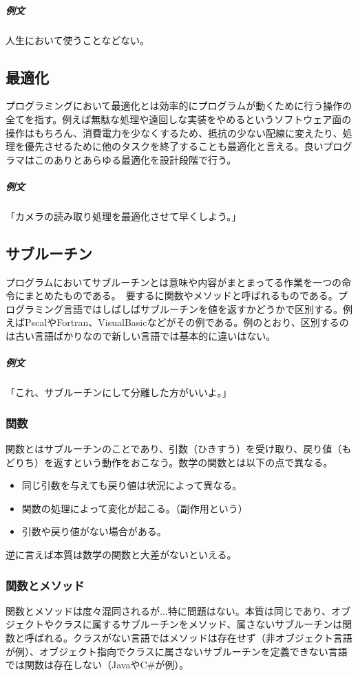 \documentclass[dvipdfmx,jb5]{jreport}
\begin{document}
\subparagraph{例文} 人生において使うことなどない。

\subsection{最適化}
プログラミングにおいて最適化とは効率的にプログラムが動くために行う操作の全てを指す。例えば無駄な処理や遠回しな実装をやめるというソフトウェア面の操作はもちろん、消費電力を少なくするため、抵抗の少ない配線に変えたり、処理を優先させるために他のタスクを終了することも最適化と言える。良いプログラマはこのありとあらゆる最適化を設計段階で行う。

\subparagraph{例文} 「カメラの読み取り処理を最適化させて早くしよう。」

\subsection{サブルーチン}
プログラムにおいてサブルーチンとは意味や内容がまとまってる作業を一つの命令にまとめたものである。　要するに関数やメソッドと呼ばれるものである。プログラミング言語ではしばしばサブルーチンを値を返すかどうかで区別する。例えばPscalやFortran、VisualBasicなどがその例である。例のとおり、区別するのは古い言語ばかりなので新しい言語では基本的に違いはない。

\subparagraph{例文} 「これ、サブルーチンにして分離した方がいいよ。」

\subsubsection{関数}
関数とはサブルーチンのことであり、引数（ひきすう）を受け取り、戻り値（もどりち）を返すという動作をおこなう。数学の関数とは以下の点で異なる。

\begin{itemize}
      \item 同じ引数を与えても戻り値は状況によって異なる。
      \item 関数の処理によって変化が起こる。（副作用という）
      \item 引数や戻り値がない場合がある。
\end{itemize}

逆に言えば本質は数学の関数と大差がないといえる。

\subsubsection{関数とメソッド}
関数とメソッドは度々混同されるが...特に問題はない。本質は同じであり、オブジェクトやクラスに属するサブルーチンをメソッド、属さないサブルーチンは関数と呼ばれる。クラスがない言語ではメソッドは存在せず（非オブジェクト言語が例）、オブジェクト指向でクラスに属さないサブルーチンを定義できない言語では関数は存在しない（JavaやC\#が例）。
\end{document}
